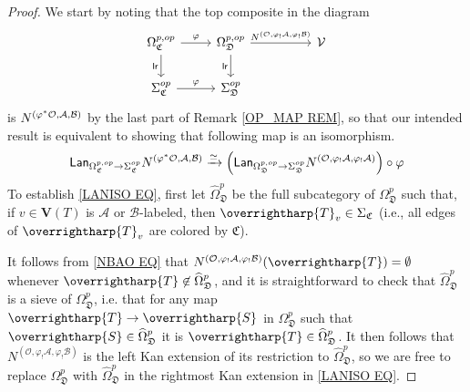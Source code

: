 \documentclass[a4paper,10pt
]{article}%
\numberwithin{equation}{section}
\numberwithin{figure}{section}
\theoremstyle{definition} %
\newcommand{\vect}[1]{\text{\overrightharp{\ensuremath{#1}}}}
\newcommand{\1}{\ensuremath{\mathbbm 1}}%
\begin{document}
\begin{proof}%
	
	We start by noting that the top composite in the diagram
	\[
	\begin{tikzcd}
	\Omega_{\mathfrak{C}}^{p,op} \ar{r}{\varphi} \ar{d}[swap]{\mathsf{lr}} &
	\Omega_{\mathfrak{D}}^{p,op} 
	\ar{rr}{N^{(\mathcal{O},\varphi_!\mathcal{A},\varphi_!\mathcal{B})}}
	\ar{d}[swap]{\mathsf{lr}} &&
	\mathcal{V}
	\\
	\Sigma_{\mathfrak{C}}^{op} \ar{r}{\varphi} &
	\Sigma_{\mathfrak{D}}^{op} 
	\end{tikzcd}
	\]
	is $N^{(\varphi^{\**}\mathcal{O},\mathcal{A},\mathcal{B})}$
	by the last part of Remark \ref{OP_MAP REM}, 
	so that our intended result is equivalent to showing that 
	following map is an isomorphism.
	\begin{equation}\label{LANISO EQ}
	\mathsf{Lan}_{\Omega_{\mathfrak{C}}^{p,op} \to \Sigma_{\mathfrak{C}}^{op}}
	N^{(\varphi^{\**}\mathcal{O},\mathcal{A},\mathcal{B})}
	\xrightarrow{\simeq}
	\left(
	\mathsf{Lan}_{\Omega_{\mathfrak{D}}^{p,op} \to \Sigma_{\mathfrak{D}}^{op}}
	N^{(\mathcal{O},\varphi_!\mathcal{A},\varphi_!\mathcal{A})}
	\right) \circ \varphi 
	\end{equation}
%
	To establish \eqref{LANISO EQ}, first let $\widehat{\Omega}^p_{\mathfrak{D}}$
	be the full subcategory of $\Omega^p_{\mathfrak{D}}$
	such that,
	if $v \in \boldsymbol{V}(T)$ is 
	$\mathcal{A}$ or $\mathcal{B}$-labeled,
	then $\vect{T}_v \in \Sigma_{\mathfrak C}$
	(i.e., all edges of $\vect{T}_v$ are colored by $\mathfrak{C}$).
	
	It follows from \eqref{NBAO EQ} that 
	$N^{(\mathcal{O}, \varphi_! \mathcal{A}, \varphi_! \mathcal{B})}(\vect{T}) =
	\emptyset$ whenever $\vect{T} \not \in \widehat{\Omega}^p_{\mathfrak{D}}$,
	and it is straightforward to check that 
	$\widehat{\Omega}^p_{\mathfrak{D}}$
	is a sieve of $\Omega^p_{\mathfrak{D}}$, 
	i.e. that for any map $\vect{T} \to \vect{S}$ 
	in $\Omega^p_{\mathfrak{D}}$ such that 
	$\vect{S} \in \widehat{\Omega}^p_{\mathfrak{D}}$ it is 
	$\vect{T} \in \widehat{\Omega}^p_{\mathfrak{D}}$.
	It then follows that 
	$N^{(\mathcal{O}, \varphi_! \mathcal{A}, \varphi_! \mathcal{B})}$
	is the left Kan extension of its restriction to 
	$\widehat{\Omega}^p_{\mathfrak{D}}$, 
	so we are free to replace
	$\Omega^p_{\mathfrak{D}}$
	with
	$\widehat{\Omega}^p_{\mathfrak{D}}$
	in the rightmost Kan extension in \eqref{LANISO EQ}.
	

\end{proof}
\end{document}
